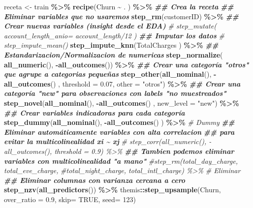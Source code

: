 \documentclass[
]{article}
\newenvironment{Shaded}{\begin{snugshade}}{\end{snugshade}}
\newcommand{\AttributeTok}[1]{\textcolor[rgb]{0.13,0.29,0.53}{#1}}
\newcommand{\CommentTok}[1]{\textcolor[rgb]{0.56,0.35,0.01}{\textit{#1}}}
\newcommand{\ConstantTok}[1]{\textcolor[rgb]{0.56,0.35,0.01}{#1}}
\newcommand{\DecValTok}[1]{\textcolor[rgb]{0.00,0.00,0.81}{#1}}
\newcommand{\DocumentationTok}[1]{\textcolor[rgb]{0.56,0.35,0.01}{\textbf{\textit{#1}}}}
\newcommand{\FloatTok}[1]{\textcolor[rgb]{0.00,0.00,0.81}{#1}}
\newcommand{\FunctionTok}[1]{\textcolor[rgb]{0.13,0.29,0.53}{\textbf{#1}}}
\newcommand{\NormalTok}[1]{#1}
\newcommand{\OtherTok}[1]{\textcolor[rgb]{0.56,0.35,0.01}{#1}}
\newcommand{\SpecialCharTok}[1]{\textcolor[rgb]{0.81,0.36,0.00}{\textbf{#1}}}
\newcommand{\StringTok}[1]{\textcolor[rgb]{0.31,0.60,0.02}{#1}}
\begin{document}
\begin{Shaded}
\begin{Highlighting}[]
\NormalTok{receta }\OtherTok{\textless{}{-}}\NormalTok{ train }\SpecialCharTok{\%\textgreater{}\%}
\FunctionTok{recipe}\NormalTok{(Churn }\SpecialCharTok{\textasciitilde{}}\NormalTok{ . ) }\SpecialCharTok{\%\textgreater{}\%} \DocumentationTok{\#\# Crea la receta}
\DocumentationTok{\#\# Eliminar variables que no usaremos}
\FunctionTok{step\_rm}\NormalTok{(customerID) }\SpecialCharTok{\%\textgreater{}\%}
\DocumentationTok{\#\# Crear nuevas variables (insight desde el EDA)}
\CommentTok{\# step\_mutate( account\_length\_anio= account\_length/12 )}
\DocumentationTok{\#\# Imputar los datos}
\CommentTok{\# step\_impute\_mean()}
\FunctionTok{step\_impute\_knn}\NormalTok{(TotalCharges ) }\SpecialCharTok{\%\textgreater{}\%}
\DocumentationTok{\#\# Estandarizacion/Normalizacion de numericas}
\FunctionTok{step\_normalize}\NormalTok{( }\FunctionTok{all\_numeric}\NormalTok{(), }\SpecialCharTok{{-}}\FunctionTok{all\_outcomes}\NormalTok{()) }\SpecialCharTok{\%\textgreater{}\%}
\DocumentationTok{\#\# Crear una categoría "otros" que agrupe a categorias pequeñas}
\FunctionTok{step\_other}\NormalTok{(}\FunctionTok{all\_nominal}\NormalTok{(), }\SpecialCharTok{{-}}\FunctionTok{all\_outcomes}\NormalTok{() , }\AttributeTok{threshold =} \FloatTok{0.07}\NormalTok{, }\AttributeTok{other =} \StringTok{"otros"}\NormalTok{) }\SpecialCharTok{\%\textgreater{}\%}
\DocumentationTok{\#\# Crear una categoría "new" para observaciones con labels "no muestreados"}
\FunctionTok{step\_novel}\NormalTok{(}\FunctionTok{all\_nominal}\NormalTok{(), }\SpecialCharTok{{-}}\FunctionTok{all\_outcomes}\NormalTok{() , }\AttributeTok{new\_level =} \StringTok{"new"}\NormalTok{) }\SpecialCharTok{\%\textgreater{}\%}
\DocumentationTok{\#\# Crear variables indicadoras para cada categoría}
\FunctionTok{step\_dummy}\NormalTok{(}\FunctionTok{all\_nominal}\NormalTok{(), }\SpecialCharTok{{-}}\FunctionTok{all\_outcomes}\NormalTok{() ) }\SpecialCharTok{\%\textgreater{}\%} \CommentTok{\# Dummy}
\DocumentationTok{\#\# Eliminar automáticamente variables con alta correlacion}
\DocumentationTok{\#\# para evitar la multicolinealidad xi \textasciitilde{} xj}
\CommentTok{\# step\_corr(all\_numeric(), {-}all\_outcomes(), threshold = 0.9) \%\textgreater{}\%}
\DocumentationTok{\#\# Tambien podemos eliminar variables con multicolinealidad "a mano"}
\CommentTok{\#step\_rm(total\_day\_charge, total\_eve\_charge,}
\CommentTok{\#total\_night\_charge, total\_intl\_charge) \%\textgreater{}\% \# Eliminar}
\DocumentationTok{\#\# Eliminar columnas con varianza cercana a cero}
\FunctionTok{step\_nzv}\NormalTok{(}\FunctionTok{all\_predictors}\NormalTok{()) }\SpecialCharTok{\%\textgreater{}\%} 
\NormalTok{themis}\SpecialCharTok{::}\FunctionTok{step\_upsample}\NormalTok{(Churn, }\AttributeTok{over\_ratio =} \FloatTok{0.9}\NormalTok{, }\AttributeTok{skip=} \ConstantTok{TRUE}\NormalTok{, }\AttributeTok{seed=} \DecValTok{123}\NormalTok{)  }
\end{Highlighting}
\end{Shaded}
\end{document}
